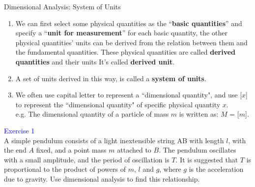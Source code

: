 \documentclass{beamer}
\begin{document}
\begin{frame}{Dimensional Analysis: System of Units}
\begin{enumerate}
  \item We can first select some physical quantities as the ``\textbf{basic quantities}”
  and specify a ``\textbf{unit for measurement}” for each basic quantity,
  the other physical quantities' units can be derived from the
  relation between them and the fundamental
  quantities. These physical quantities are called \textbf{derived quantities}
  and their units It's called \textbf{derived unit}.
  \pause
  \item A set of units derived in this way, is called a \textbf{system of units}.
  \pause
  \item We often use capital letter to represent a ``dimensional quantity", and
  use [$x$] to represent the ``dimensional quantity" of specific physical quantity $x$.\\
  \pause
  e.g. The dimensional quantity of a particle of mass $m$ is written as: $M$ = [$m$].
\end{enumerate}
\end{frame}

\begin{frame}
  \textcolor{blue}{Exercise 1}\\
  A simple pendulum consists of a light inextensible string AB with length $l$, with the end $A$ fixed, and a point mass $m$ attached to $B$. The pendulum oscillates with a small amplitude, and the period of oscillation is $T$. It is suggested that $T$ is proportional to the product of powers of $m$, $l$ and $g$, where $g$ is the acceleration due to gravity. Use dimensional analysis to find this relationship. 
\end{frame}
\end{document}
